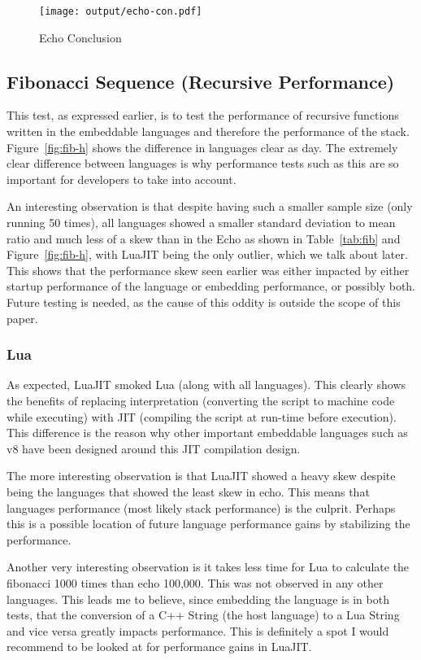 \begin{figure}[H]
	\centering
		\texttt{[image: output/echo-con.pdf]}
	\caption{Echo Conclusion}
	\label{fig:echo-con}
\end{figure}

\subsection{Fibonacci Sequence (Recursive Performance)} \label{sec:analysis:fib}
This test, as expressed earlier, is to test the performance of recursive functions written in the embeddable languages and therefore the performance of the stack. Figure~\ref{fig:fib-h} shows the difference in languages clear as day. The extremely clear difference between languages is why performance tests such as this are so important for developers to take into account.

An interesting observation is that despite having such a smaller sample size (only running 50 times), all languages showed a smaller standard deviation to mean ratio and much less of a skew than in the Echo as shown in Table~\ref{tab:fib} and Figure~\ref{fig:fib-h}, with LuaJIT being the only outlier, which we talk about later. This shows that the performance skew seen earlier was either impacted by either startup performance of the language or embedding performance, or possibly both. Future testing is needed, as the cause of this oddity is outside the scope of this paper.

\subsubsection{Lua}
As expected, LuaJIT smoked Lua (along with all languages). This clearly shows the benefits of replacing interpretation (converting the script to machine code while executing) with JIT (compiling the script at run-time before execution). This difference is the reason why other important embeddable languages such as v8\cite{v8} have been designed around this JIT compilation design.

The more interesting observation is that LuaJIT showed a heavy skew despite being the languages that showed the least skew in echo. This means that languages performance (most likely stack performance) is the culprit. Perhaps this is a possible location of future language performance gains by stabilizing the performance.

Another very interesting observation is it takes less time for Lua to calculate the fibonacci 1000 times than echo 100,000. This was not observed in any other languages. This leads me to believe, since embedding the language is in both tests, that the conversion of a C++ String (the host language) to a Lua String and vice versa greatly impacts performance. This is definitely a spot I would recommend to be looked at for performance gains in LuaJIT.

